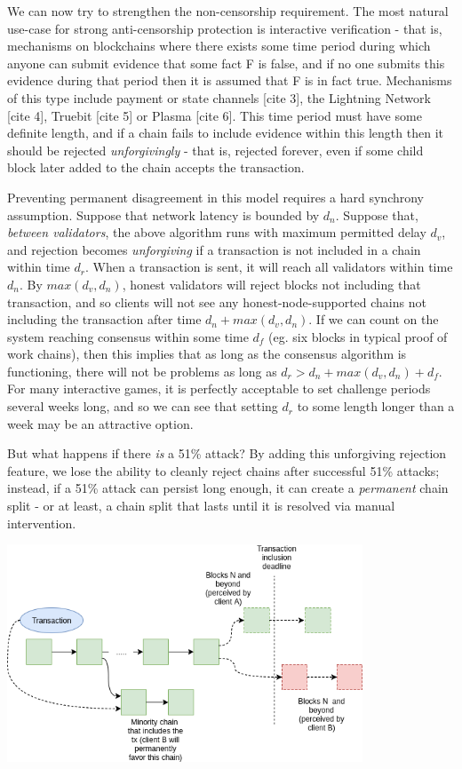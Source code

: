 \documentclass[12pt]{article}
\begin{document}
We can now try to strengthen the non-censorship requirement. The most natural use-case for strong anti-censorship protection is interactive verification - that is, mechanisms on blockchains where there exists some time period during which anyone can submit evidence that some fact F is false, and if no one submits this evidence during that period then it is assumed that F is in fact true. Mechanisms of this type include payment or state channels [cite 3], the Lightning Network [cite 4], Truebit [cite 5] or Plasma [cite 6]. This time period must have some definite length, and if a chain fails to include evidence within this length then it should be rejected \textit{unforgivingly} - that is, rejected forever, even if some child block later added to the chain accepts the transaction.

Preventing permanent disagreement in this model requires a hard synchrony assumption. Suppose that network latency is bounded by $d_n$. Suppose that, \textit{between validators}, the above algorithm runs with maximum permitted delay $d_v$, and rejection becomes \textit{unforgiving} if a transaction is not included in a chain within time $d_r$. When a transaction is sent, it will reach all validators within time $d_n$. By $max(d_v, d_n)$, honest validators will reject blocks not including that transaction, and so clients will not see any honest-node-supported chains not including the transaction after time $d_n + max(d_v, d_n)$. If we can count on the system reaching consensus within some time $d_f$ (eg. six blocks in typical proof of work chains), then this implies that as long as the consensus algorithm is functioning, there will not be problems as long as $d_r > d_n + max(d_v, d_n) + d_f$. For many interactive games, it is perfectly acceptable to set challenge periods several weeks long, and so we can see that setting $d_r$ to some length longer than a week may be an attractive option.

But what happens if there \textit{is} a 51\% attack? By adding this unforgiving rejection feature, we lose the ability to cleanly reject chains after successful 51\% attacks; instead, if a 51\% attack can persist long enough, it can create a \textit{permanent} chain split - or at least, a chain split that lasts until it is resolved via manual intervention.

\includegraphics[width=400px]{Censorship5.png}
\end{document}
